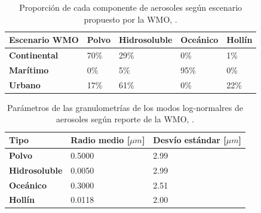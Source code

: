         \begin{table}
        \caption[Proporción de cada componente de aerosoles según escenarios WMO.]{Proporción de cada componente de aerosoles según escenario propuesto por la WMO, \cite{wmo1986}.}
        \begin{tabular}{|l|l|l|l|l|}
        \hline
        \textbf{Escenario WMO} & \textbf{Polvo} & \textbf{Hidrosoluble} & \textbf{Oceánico} & \textbf{Hollín} \\ \hline
        \textbf{Continental}   & 70\%           & 29\%                  & 0\%               & 1\%             \\ \hline
        \textbf{Marítimo}      & 0\%            & 5\%                   & 95\%              & 0\%             \\ \hline
        \textbf{Urbano}        & 17\%           & 61\%                  & 0\%               & 22\%            \\ \hline
        \end{tabular}
        \label{int:tab:wmo_CMU}
        \end{table}

        \begin{table}
        \caption[Parámetros de las granulometrías de los modos log-normalres de aerosoles según reporte de la WMO.]{Parámetros de las granulometrías de los modos log-normalres de aerosoles según reporte de la WMO, \cite{wmo1986}.}
        \begin{tabular}{|l|l|l|}
        \hline
        \textbf{Tipo}         & \textbf{Radio medio [$\mu m$]} & \textbf{Desvío estándar [$\mu m$]} \\ \hline
        \textbf{Polvo}        & 0.5000                         & 2.99                               \\ \hline
        \textbf{Hidrosoluble} & 0.0050                         & 2.99                               \\ \hline
        \textbf{Oceánico}     & 0.3000                         & 2.51                               \\ \hline
        \textbf{Hollín}       & 0.0118                         & 2.00                               \\ \hline
        \end{tabular}
        \label{int:tab:wmo_modos}
        \end{table}


